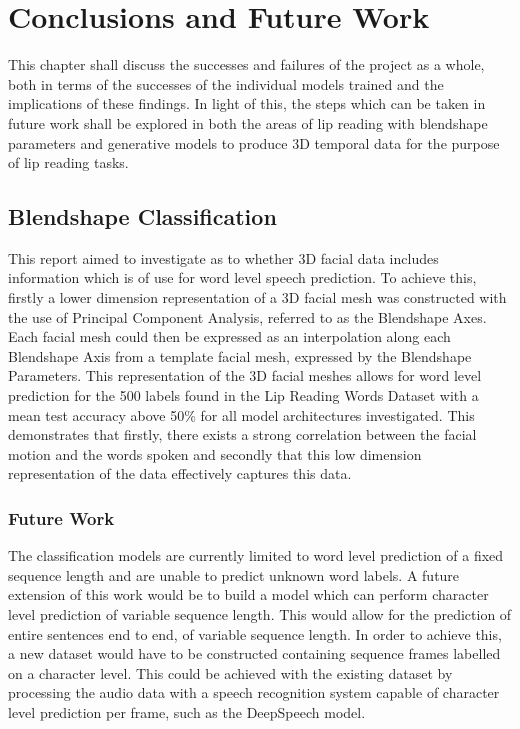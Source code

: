 \chapter{Conclusions and Future Work}

This chapter shall discuss the successes and failures of the project as a whole, both in terms of the successes of the individual models trained and the implications of these findings.
In light of this, the steps which can be taken in future work shall be explored in both the areas of lip reading with blendshape parameters and generative models to produce 3D temporal data for the purpose of lip reading tasks.

\section{Blendshape Classification}\label{sec:class_conc}
This report aimed to investigate as to whether 3D facial data includes information which is of use for word level speech prediction.
To achieve this, firstly a lower dimension representation of a 3D facial mesh was constructed with the use of Principal Component Analysis, referred to as the Blendshape Axes.
Each facial mesh could then be expressed as an interpolation along each Blendshape Axis from a template facial mesh, expressed by the Blendshape Parameters.
This representation of the 3D facial meshes allows for word level prediction for the 500 labels found in the Lip Reading Words Dataset with a mean test accuracy above 50\% for all model architectures investigated.
This demonstrates that firstly, there exists a strong correlation between the facial motion and the words spoken and secondly that this low dimension representation of the data effectively captures this data.

\subsection{Future Work}
The classification models are currently limited to word level prediction of a fixed sequence length and are unable to predict unknown word labels.
A future extension of this work would be to build a model which can perform character level prediction of variable sequence length.
This would allow for the prediction of entire sentences end to end, of variable sequence length.
In order to achieve this, a new dataset would have to be constructed containing sequence frames labelled on a character level.
This could be achieved with the existing dataset by processing the audio data with a speech recognition system capable of character level prediction per frame, such as the DeepSpeech model.

